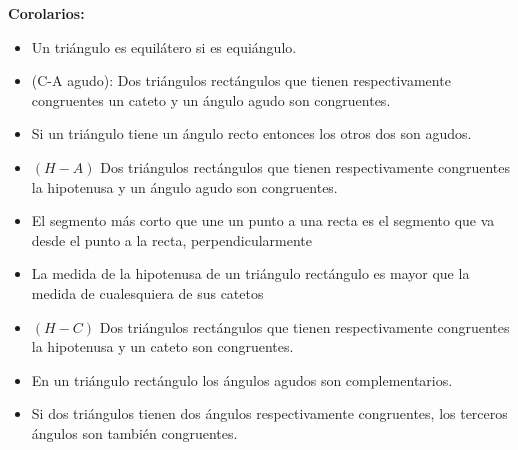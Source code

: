 \documentclass[•]{article}
\begin{document}
\textbf{Corolarios:}
\begin{itemize}
	\item Un tri\'angulo es equil\'atero si es equi\'angulo.
	\item (C-A agudo): Dos tri\'angulos rect\'angulos que tienen respectivamente congruentes un cateto y un \'angulo agudo son congruentes.
	\item Si un tri\'angulo tiene un \'angulo recto entonces los otros dos son agudos.
	\item $(H-A)$ Dos tri\'angulos rect\'angulos que tienen respectivamente congruentes la hipotenusa y un \'angulo agudo son congruentes.
	\item El segmento m\'as corto que une un punto a una recta es el segmento que va desde el punto a la recta, perpendicularmente
	\item La medida de la hipotenusa de un tri\'angulo rect\'angulo es mayor que la medida de cualesquiera de sus catetos
	\item $(H-C)$ Dos tri\'angulos rect\'angulos que tienen respectivamente congruentes la hipotenusa y un cateto son congruentes.
	\item En un tri\'angulo rect\'angulo los \'angulos agudos son complementarios.
	\item Si dos tri\'angulos tienen dos \'angulos respectivamente congruentes, los terceros \'angulos son tambi\'en congruentes.

\end{itemize}
\end{document}
